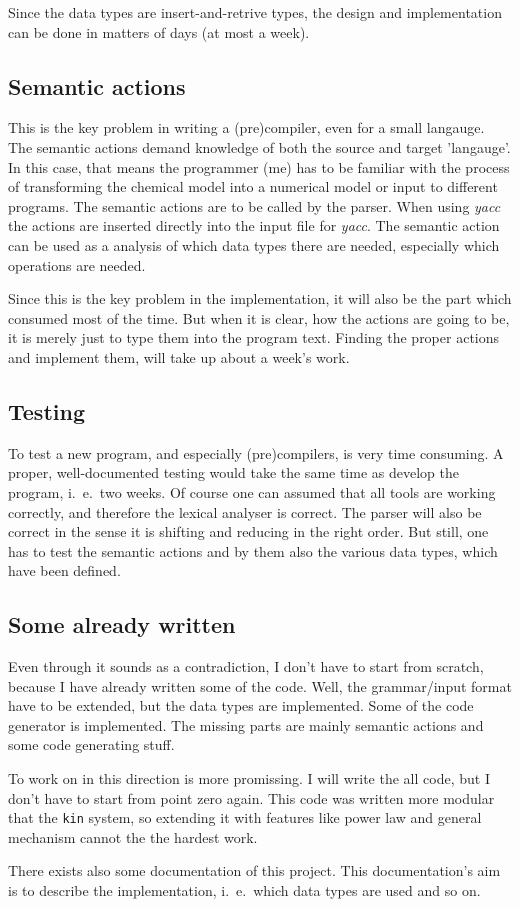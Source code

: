 Since the data types are insert-and-retrive types, the design and implementation
can be done in matters of days (at most a week). 

\subsection{Semantic actions}
This is the key problem in writing a (pre)compiler, even for a small langauge.
The semantic actions demand knowledge of both the source and target 'langauge'.
In this case, that means the programmer (me) has to be familiar with the process
of transforming the chemical model into a numerical model or input to 
different programs. The semantic actions are to be called by the parser. When
using {\em yacc} the actions are inserted directly into the input file for
{\em yacc}. The semantic action can be used as a analysis of which data types
there are needed, especially which operations are needed. 

Since this is the key problem in the implementation, it will also be the part
which consumed most of the time. But when it is clear, how the actions are
going to be, it is merely just to type them into the program text. Finding
the proper actions and implement them, will take up about a week's work. 

\subsection{Testing}
To test a new program, and especially (pre)compilers, is very time consuming.
A proper, well-documented testing would take the same time as develop the
program, i.\ e.\ two weeks. Of course one can assumed that all tools are
working correctly, and therefore the lexical analyser is correct. The parser
will also be correct in the sense it is shifting and reducing in the right
order. But still, one has to test the semantic actions and by them also the
various data types, which have been defined.

\subsection{Some already written}
Even through it sounds as a contradiction, I don't have to start from scratch,
because I have already written some of the code. Well, the grammar/input format have
to be extended, but the data types are implemented. Some of the code generator
is implemented. The missing parts are mainly semantic actions and some code
generating stuff.

To work on in this direction is more promissing. I will write the all code,
but I don't have to start from point zero again. This code was written 
more modular that the {\tt kin} system, so extending it with features like
power law and general mechanism cannot the the hardest work. 

There exists also some documentation of this project. This documentation's
aim is to describe the implementation, i.\ e.\ which data types are used 
and so on.


